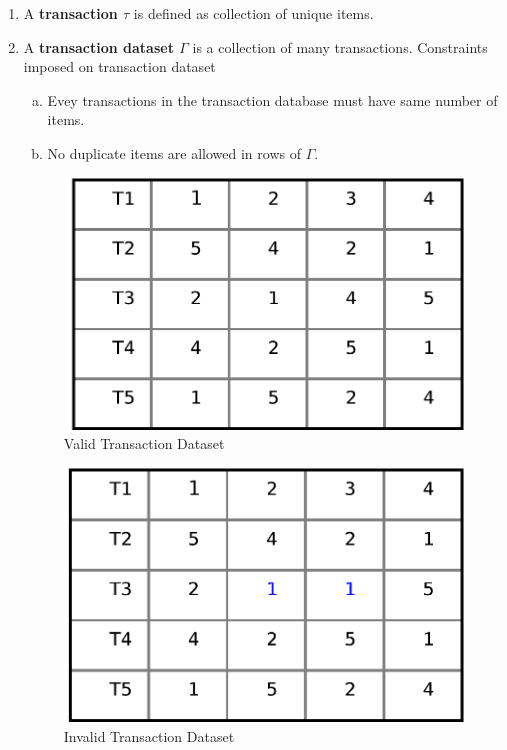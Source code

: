 \documentclass[review]{elsarticle}
\begin{document}
\begin{enumerate}[1.]
\item A \textbf{transaction $ \tau $} is defined as collection of unique items.
\item A \textbf{transaction dataset $ \Gamma $} is a collection of many transactions. Constraints imposed on  transaction dataset
\begin{enumerate}[a)]
\item Evey transactions in the transaction database must have same number of items.
\item No duplicate items are allowed in rows of $ \Gamma $.
\end{enumerate}

\begin{figure}
\begin{center}
\includegraphics[scale=0.4]{pdf/validtrans}
\end{center}
\caption{Valid Transaction Dataset}
\label{Fig 1}
\end{figure}

\begin{figure}
\begin{center}
\includegraphics[scale=0.4]{pdf/invalidtrans}
\end{center}
\caption{Invalid Transaction Dataset}
\label{Fig 2}
\end{figure}


\end{enumerate}
\end{document}
